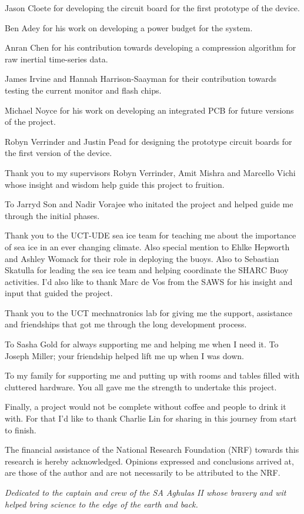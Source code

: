 \documentclass[a4paper, 12pt, oneside, openright, parskip=full]{book}
\newcommand{\nrf}									   
{	
The financial assistance of the National Research Foundation (NRF) towards this research is hereby acknowledged. Opinions expressed and conclusions arrived at, are those of the author and are not necessarily to be attributed to the NRF.
}
\begin{document}
Jason Cloete for developing the circuit board for the first prototype of the device.

Ben Adey for his work on developing a power budget for the system. 

Anran Chen for his contribution towards developing a compression algorithm for raw inertial time-series data.

James Irvine and Hannah Harrison-Saayman for their contribution towards testing the current monitor and flash chips.

Michael Noyce for his work on developing an integrated PCB for future versions of the project.

Robyn Verrinder and Justin Pead for designing the prototype circuit boards for the first version of the device.

Thank you to my supervisors Robyn Verrinder, Amit Mishra and Marcello Vichi whose insight and wisdom help guide this project to fruition.

To Jarryd Son and Nadir Vorajee who initated the project and helped guide me through the initial phases. 
 
Thank you to the UCT-UDE sea ice team for teaching me about the importance of sea ice in an ever changing climate. Also special mention to Ehlke Hepworth and Ashley Womack for their role in deploying the buoys. Also to Sebastian Skatulla for leading the sea ice team and helping coordinate the SHARC Buoy activities. I'd also like to thank Marc de Vos from the SAWS for his insight and input that guided the project.

Thank you to the UCT mechnatronics lab for giving me the support, assistance and friendships that got me through the long development process. 

To Sasha Gold for always supporting me and helping me when I need it. To Joseph Miller; your friendship helped lift me up when I was down.

To my family for supporting me and putting up with rooms and tables filled with cluttered hardware. You all gave me the strength to undertake this project.

Finally, a project would not be complete without coffee and people to drink it with. For that I'd like to thank Charlie Lin for sharing in this journey from start to finish.

\nrf
\begin{flushright}
	\centering
	\vspace*{10cm}
	{\itshape Dedicated to the captain and crew of the SA Aghulas II whose bravery and wit helped bring science to the edge of the earth and back.\\}
\end{flushright}
\tableofcontents
\end{document}
